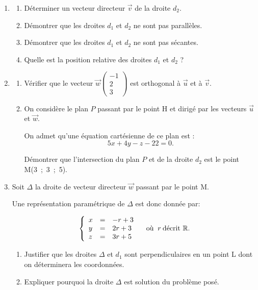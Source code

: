 \documentclass[10pt]{article}
\providecommand{\R}{\mathbb{R}}
\providecommand{\vect}[1]{\overrightarrow{#1}}
\begin{document}
\begin{enumerate}
\item
	\begin{enumerate}
		\item Déterminer un vecteur directeur $\vect{v}$ de la droite $d_2$. 
		\item Démontrer que les droites $d_1$ et $d_2$ ne sont pas parallèles. 
		\item Démontrer que les droites $d_1$ et $d_2$  ne sont pas sécantes. 
		\item Quelle est la position relative des droites $d_1$ et $d_2$ ?
	\end{enumerate}
\item 
	\begin{enumerate}
		\item Vérifier que le vecteur $\vect{w}\begin{pmatrix}-1\\2\\3\end{pmatrix}$ est orthogonal à $\vect{u}$ et à $\vect{v}$.
		\item On considère le plan $P$ passant par le point H et dirigé par les vecteurs $\vect{u}$ et $\vect{w}$.
		
On admet qu'une équation cartésienne de ce plan est :
\[5x + 4y - z - 22 = 0.\]

Démontrer que l'intersection du plan $P$ et de la droite $d_2$ est le point M(3~;~3~;~5).
	\end{enumerate}
\item Soit $\Delta$ la droite de vecteur directeur $\vect{w}$ passant par le point M. 

Une représentation paramétrique de $\Delta$ est donc donnée par:

\[\left\{\begin{array}{l c l}
x &=&- r + 3 \\
y &= &2r + 3\\
z &=& 3r + 5
\end{array}\right. \quad \text{où }\:r\: \text{décrit }\R.\]

	\begin{enumerate}
		\item Justifier que les droites $\Delta$ et $d_1$ sont perpendiculaires
en un point L dont on déterminera les coordonnées.
		\item Expliquer pourquoi la droite $\Delta$ est solution du problème posé.
	\end{enumerate}
\end{enumerate}

\bigskip
\end{document}
